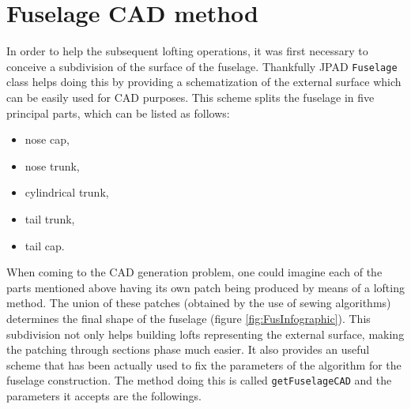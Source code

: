 \section{Fuselage CAD method}
\label{sec3.3}

In order to help the subsequent lofting operations, it was first necessary to conceive a subdivision of the surface of the fuselage. Thankfully \gls{JPAD} \lstinline[language=Java]!Fuselage! class helps doing this by providing a schematization of the external surface which can be easily used for \gls{CAD} purposes. This scheme splits the fuselage in five principal parts, which can be listed as follows:
%
\begin{itemize}
\item nose cap,
\item nose trunk,
\item cylindrical trunk,
\item tail trunk,
\item tail cap.
\end{itemize}
%
When coming to the \gls{CAD} generation problem, one could imagine each of the parts mentioned above having its own patch being produced by means of a lofting method. The union of these patches (obtained by the use of sewing algorithms) determines the final shape of the fuselage (figure \ref{fig:FusInfographic}). This subdivision not only helps building lofts representing the external surface, making the patching through sections phase much easier. It also provides an useful scheme that has been actually used to fix the parameters of the algorithm for the fuselage construction. The method doing this is called \lstinline[language=Java]!getFuselageCAD! and the parameters it accepts are the followings.
%
